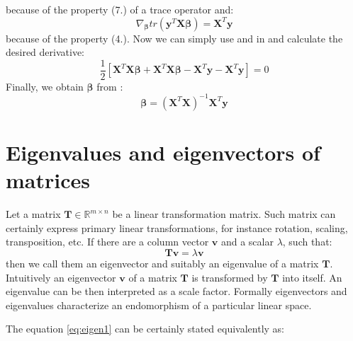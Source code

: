 \documentclass[english,a4paper,twoside]{ppfcmthesis}
\begin{document}
\begin{appendices}
because of the property (7.) of a trace operator and:
\begin{equation}\label{eq:least5}
    \nabla_{\boldsymbol{\beta}}tr(\boldsymbol{y}^T\boldsymbol{X}\boldsymbol{\beta}) = \boldsymbol{X}^T\boldsymbol{y}
\end{equation}
because of the property (4.).
Now we can simply use  and  in  and calculate the desired derivative:
\begin{equation}\label{eq:least6}
    \frac{1}{2}[\boldsymbol{X}^T\boldsymbol{X}\boldsymbol{\beta}+\boldsymbol{X}^T\boldsymbol{X}\boldsymbol{\beta}-\boldsymbol{X}^T\boldsymbol{y}-\boldsymbol{X}^T\boldsymbol{y}] = 0
\end{equation}
Finally, we obtain $\boldsymbol{\beta}$ from :
\begin{equation}
    \boldsymbol{\beta}=(\boldsymbol{X}^T\boldsymbol{X})^{-1}\boldsymbol{X}^T\boldsymbol{y}
\end{equation}

\newpage
\section{Eigenvalues and eigenvectors of matrices}
\label{app:eigen}

Let a matrix $\boldsymbol{T} \in \mathbb{R}^{m \times n}$ be a linear transformation matrix. Such matrix can certainly express primary linear transformations, for instance rotation, scaling, transposition, etc. If there are a column vector $\boldsymbol{v}$ and a scalar $\lambda$, such that:
\begin{equation}\label{eq:eigen1}
    \boldsymbol{T}\boldsymbol{v}=\lambda{\boldsymbol{v}}
\end{equation}
then we call them an eigenvector and suitably an eigenvalue of a matrix $\boldsymbol{T}$. Intuitively an eigenvector $\boldsymbol{v}$ of a matrix $\boldsymbol{T}$ is transformed by $\boldsymbol{T}$ into itself. An eigenvalue can be then interpreted as a scale factor. Formally eigenvectors and eigenvalues characterize an endomorphism of a particular linear space.  

The equation \ref{eq:eigen1} can be certainly stated equivalently as:


\end{appendices}
\end{document}
